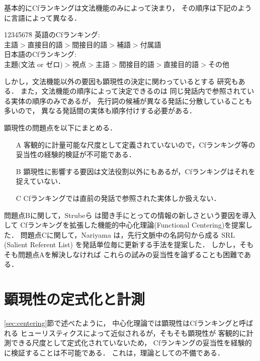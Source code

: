 基本的にCfランキングは文法機能のみによって決まり，
その順序は下記のように言語によって異なる．
\begin{tabbing}
1234\=5678\=\kill
\>英語のCfランキング:\\
\>\>主語$>$直接目的語$>$間接目的語$>$補語$>$付属語 \\
\>日本語のCfランキング\cite{walker1994}:\\
\>\>主題(文法 or ゼロ)$>$視点$>$主語$>$間接目的語$>$直接目的語$>$その他
\end{tabbing}

しかし，文法機能以外の要因も顕現性の決定に関わっているとする
研究もある\cite{strube1999,reed2002}．
また，文法機能の順序によって決定できるのは
同じ発話内で参照されている実体の順序のみであるが，
先行詞の候補が異なる発話に分散していることも多いので，
異なる発話間の実体も順序付けする必要がある．

顕現性の問題点を以下にまとめる．
\begin{itemize}
\item[A] 客観的に計量可能な尺度として定義されていないので，Cfランキング等の妥当性の経験的検証が不可能である．
\item[B] 顕現性に影響する要因は文法役割以外にもあるが，Cfランキングはそれを捉えていない．
\item[C] Cfランキングでは直前の発話で参照された実体しか扱えない．
\end{itemize}

問題点Bに関して，Strubeら
\citeyear{strube1999}は聞き手にとっての情報の新しさという要因を導入して
Cfランキングを拡張した機能的中心化理論(Functional Centering)を提案した．
問題点Cに関して，Nariyama
\citeyear{nariyama2001}は，先行文脈中の名詞句から成る
SRL (Salient Referent List) を発話単位毎に更新する手法を提案した．
しかし，そもそも問題点Aを解決しなければ
これらの試みの妥当性を論ずることも困難である．










\section{顕現性の定式化と計測}\label{sec:ref_prob}
\ref{sec:centering}節で述べたように，
中心化理論では顕現性はCfランキングと呼ばれる
ヒューリスティクスによって近似されるが，そもそも顕現性が
客観的に計測できる尺度として定式化されていないため，
Cfランキングの妥当性を経験的に検証することは不可能である．
これは，理論としての不備である．

